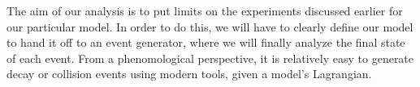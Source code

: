 \label{chapter:analysis}

The aim of our analysis is to put limits on the experiments discussed earlier for our particular model.
In order to do this, we will have to clearly define our model to hand it off to an event generator, where we will finally analyze the final state of each event.
From a phenomological perspective, it is relatively easy to generate decay or collision events using modern tools, given a model's Lagrangian. 




